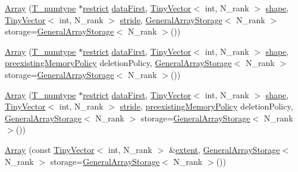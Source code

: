 \begin{DoxyCompactItemize}
\item 
\hyperlink{classArray_a7553ce1380cddf472e69957f4c3ca5ab}{Array} (\hyperlink{classArray_ae72770f4a1d2f8b7193badafc320f008}{T\+\_\+numtype} $\ast$\hyperlink{compiler_8h_a080abdcb9c02438f1cd2bb707af25af8}{restrict} \hyperlink{classArray_a11659c9e06ad710292be467d337adc0f}{data\+First}, \hyperlink{classTinyVector}{Tiny\+Vector}$<$ int, N\+\_\+rank $>$ \hyperlink{classArray_aab2fe0a092fc7acfcdbac8e24dfc1252}{shape}, \hyperlink{classTinyVector}{Tiny\+Vector}$<$ int, N\+\_\+rank $>$ \hyperlink{classArray_ad8f8e0b4804530717a7fb4fe4c434d29}{stride}, \hyperlink{classGeneralArrayStorage}{General\+Array\+Storage}$<$ N\+\_\+rank $>$ storage=\hyperlink{classGeneralArrayStorage}{General\+Array\+Storage}$<$ N\+\_\+rank $>$())
\item 
\hyperlink{classArray_a5a9cc589b8ebfbdb4346ee6d8d0a2c0d}{Array} (\hyperlink{classArray_ae72770f4a1d2f8b7193badafc320f008}{T\+\_\+numtype} $\ast$\hyperlink{compiler_8h_a080abdcb9c02438f1cd2bb707af25af8}{restrict} \hyperlink{classArray_a11659c9e06ad710292be467d337adc0f}{data\+First}, \hyperlink{classTinyVector}{Tiny\+Vector}$<$ int, N\+\_\+rank $>$ \hyperlink{classArray_aab2fe0a092fc7acfcdbac8e24dfc1252}{shape}, \hyperlink{memblock_8h_ae9323b8f2afbf31c869a1610053247db}{preexisting\+Memory\+Policy} deletion\+Policy, \hyperlink{classGeneralArrayStorage}{General\+Array\+Storage}$<$ N\+\_\+rank $>$ storage=\hyperlink{classGeneralArrayStorage}{General\+Array\+Storage}$<$ N\+\_\+rank $>$())
\item 
\hyperlink{classArray_ad42fc440fa6c0fd93511ddaf902f9d3c}{Array} (\hyperlink{classArray_ae72770f4a1d2f8b7193badafc320f008}{T\+\_\+numtype} $\ast$\hyperlink{compiler_8h_a080abdcb9c02438f1cd2bb707af25af8}{restrict} \hyperlink{classArray_a11659c9e06ad710292be467d337adc0f}{data\+First}, \hyperlink{classTinyVector}{Tiny\+Vector}$<$ int, N\+\_\+rank $>$ \hyperlink{classArray_aab2fe0a092fc7acfcdbac8e24dfc1252}{shape}, \hyperlink{classTinyVector}{Tiny\+Vector}$<$ int, N\+\_\+rank $>$ \hyperlink{classArray_ad8f8e0b4804530717a7fb4fe4c434d29}{stride}, \hyperlink{memblock_8h_ae9323b8f2afbf31c869a1610053247db}{preexisting\+Memory\+Policy} deletion\+Policy, \hyperlink{classGeneralArrayStorage}{General\+Array\+Storage}$<$ N\+\_\+rank $>$ storage=\hyperlink{classGeneralArrayStorage}{General\+Array\+Storage}$<$ N\+\_\+rank $>$())
\item 
\hyperlink{classArray_ac0d72e6c28d65dd26c943bf2bc43a475}{Array} (const \hyperlink{classTinyVector}{Tiny\+Vector}$<$ int, N\+\_\+rank $>$ \&\hyperlink{classArray_a0e366d6568c6f976ea3657fea13794b7}{extent}, \hyperlink{classGeneralArrayStorage}{General\+Array\+Storage}$<$ N\+\_\+rank $>$ storage=\hyperlink{classGeneralArrayStorage}{General\+Array\+Storage}$<$ N\+\_\+rank $>$())

\end{DoxyCompactItemize}
